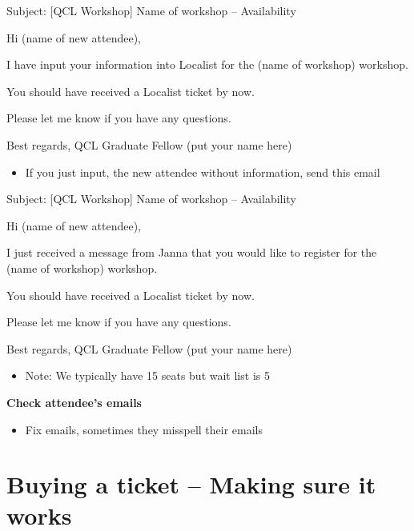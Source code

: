 \documentclass[
]{book}
\providecommand{\tightlist}{%
  \setlength{\itemsep}{0pt}\setlength{\parskip}{0pt}}
\begin{document}
Subject: {[}QCL Workshop{]} Name of workshop -- Availability

Hi (name of new attendee),

I have input your information into Localist for the (name of workshop) workshop.

You should have received a Localist ticket by now.

Please let me know if you have any questions.

Best regards,
QCL Graduate Fellow (put your name here)

\begin{itemize}
\tightlist
\item
  If you just input, the new attendee without information, send this email
\end{itemize}

Subject: {[}QCL Workshop{]} Name of workshop -- Availability

Hi (name of new attendee),

I just received a message from Janna that you would like to register for the (name of workshop) workshop.

You should have received a Localist ticket by now.

Please let me know if you have any questions.

Best regards,
QCL Graduate Fellow (put your name here)

\begin{itemize}
\tightlist
\item
  Note: We typically have 15 seats but wait list is 5
\end{itemize}

\textbf{Check attendee's emails}

\begin{itemize}
\tightlist
\item
  Fix emails, sometimes they misspell their emails
\end{itemize}

\hypertarget{buying-a-ticket-making-sure-it-works}{%
\section{Buying a ticket -- Making sure it works}\label{buying-a-ticket-making-sure-it-works}}
\end{document}
